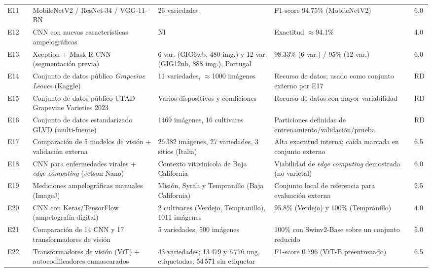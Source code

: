 \begin{longtable}{L{0.7cm}L{2.5cm}L{3.3cm}L{2.6cm}L{2.4cm}L{0.6cm}}
E11 & \citet{magalhaes2023} & MobileNetV2 / ResNet-34 / VGG-11-BN & 26 variedades & F1-score 94.75\% (MobileNetV2) & 6.0 \\
E12 & \citet{terzi2024} & CNN con nuevas características ampelográficas & NI & Exactitud $\approx$94.1\% & 4.0 \\
E13 & \citet{adao2025} & Xception + Mask R-CNN (segmentación previa) & 6 var. (GIG6wb, 480 img.) y 12 var. (GIG12nb, 888 img.), Portugal & 98.33\% (6 var.) / 95\% (12 var.) & 6.0 \\
E14 & \citet{vlah2021} & Conjunto de datos público \textit{Grapevine Leaves} (Kaggle) & 11 variedades, $\approx$1000 imágenes & Recurso de datos; usado como conjunto externo por E17 & RD \\
E15 & \citet{utad2024} & Conjunto de datos público UTAD Grapevine Varieties 2023 & Varios dispositivos y condiciones & Recurso de datos con mayor variabilidad & RD \\
E16 & \citet{glvd2026} & Conjunto de datos estandarizado GLVD (multi-fuente) & 1469 imágenes, 16 cultivares & Particiones definidas de entrenamiento/validación/prueba & RD \\
E17 & \citet{denart2024} & Comparación de 5 modelos de visión + validación externa & 26\,382 imágenes, 27 variedades, 3 sitios (Italia) & Alta exactitud interna; caída marcada en conjunto externo & 6.5 \\
E18 & \citet{lazcano2025} & CNN para enfermedades virales + \textit{edge computing} (Jetson Nano) & Contexto vitivinícola de Baja California & Viabilidad de \textit{edge computing} demostrada (no varietal) & 6.0 \\
E19 & \citet{lopez2025pvvc} & Mediciones ampelográficas manuales (ImageJ) & Misión, Syrah y Tempranillo (Baja California) & Conjunto local de referencia para evaluación externa & 2.5 \\
E20 & \citet{velez2024} & CNN con Keras/TensorFlow (ampelografía digital) & 2 cultivares (Verdejo, Tempranillo), 1011 imágenes & 95.8\% (Verdejo) y 100\% (Tempranillo) & 4.0 \\
E21 & \citet{kunduracioglu2024} & Comparación de 14 CNN y 17 transformadores de visión & 5 variedades, 500 imágenes & 100\% con Swinv2-Base sobre un conjunto reducido & 5.0 \\
E22 & \citet{carneiro2024mae} & Transformadores de visión (ViT) + autocodificadores enmascarados & 43 variedades; 13\,479 y 6\,776 img. etiquetadas; 54\,571 sin etiquetar & F1-score 0.796 (ViT-B preentrenado) & 6.5 \\

\end{longtable}
